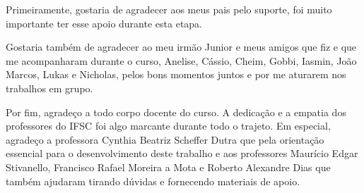 \documentclass[
	12pt,				%
	openright,			%
	oneside,			%
	a4paper,			%
	english,			%
	french,				%
	spanish,			%
	brazil				%
	]{abntex2}
\begin{document}
\frenchspacing 



\imprimircapa
\imprimirfolhaderosto* %

%











\begin{agradecimentos}
Primeiramente, gostaria de agradecer aos meus pais pelo suporte, foi muito importante ter esse apoio durante esta etapa.

Gostaria também de agradecer ao meu irmão Junior e meus amigos que fiz e que me acompanharam durante o curso,
Anelise,
Cássio,
Cheim,
Gobbi,
Iasmin,
João Marcos,
Lukas e
Nicholas,
pelos bons momentos juntos e por me aturarem nos trabalhos em grupo.

Por fim, agradeço a todo corpo docente do curso.
A dedicação e a empatia dos professores do IFSC foi algo marcante durante todo o trajeto.
Em especial, agradeço a professora Cynthia Beatriz Scheffer Dutra que pela orientação essencial para o desenvolvimento
deste trabalho e aos professores Maurício Edgar Stivanello, Francisco Rafael Moreira a Mota e Roberto Alexandre Dias
que também ajudaram tirando dúvidas e fornecendo materiais de apoio.
\end{agradecimentos}
\end{document}
